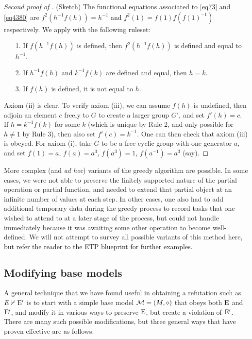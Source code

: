 \begin{proof}[Second proof of ] (Sketch)  The functional equations associated to \eqref{eq73} and \eqref{eq4380} are
$f^2(h^{-1} f(h)) =h^{-1}$ and $f^2(1) = f(1) f(f(1)^{-1})$ respectively.  We apply  with the following ruleset:
\begin{itemize}
  \item[1.]  If $f(h^{-1} f(h))$ is defined, then $f^2(h^{-1} f(h))$ is defined and equal to $h^{-1}$.
  \item[2.]  If $h^{-1} f(h)$ and $k^{-1} f(k)$ are defined and equal, then $h=k$.
  \item[3.]  If $f(h)$ is defined, it is not equal to $h$.
\end{itemize}
Axiom (ii) is clear.  To verify axiom (iii), we can assume $f(h)$ is undefined, then adjoin an element $c$ freely to $G$ to create a larger group $G'$, and set $f'(h) = c$.  If $h = k^{-1} f(k)$ for some $k$ (which is unique by Rule 2, and only possible for $h \neq 1$ by Rule 3), then also set $f'(c) = k^{-1}$.  One can then check that axiom (iii) is obeyed.  For axiom (i), take $G$ to be a free cyclic group with one generator $a$, and set $f(1) = a$, $f(a) = a^3$, $f(a^3) = 1$, $f(a^{-1}) = a^3$ (say).
\end{proof}

More complex (and \emph{ad hoc}) variants of the greedy algorithm are possible.  In some cases, we were not able to preserve the finitely supported nature of the partial operation or partial function, and needed to extend that partial object at an infinite number of values at each step.  In other cases, one also had to add additional temporary data during the greedy process to record tasks that one wished to attend to at a later stage of the process, but could not handle immediately because it was awaiting some other operation to become well-defined.  We will not attempt to survey all possible variants of this method here, but refer the reader to the ETP blueprint for further examples.

\subsection{Modifying base models}\label{modify-base}

A general technique that we have found useful in obtaining a refutation such as $E \nvdash {\mathrm{E}'}$ is to start with a simple base model ${\mathcal{M}} = (M,\diamond)$ that obeys both $\mathrm{E}$ and ${\mathrm{E}'}$, and modify it in various ways to preserve $\mathrm{E}$, but create a violation of ${\mathrm{E}'}$.  There are many such possible modifications, but three general ways that have proven effective are as follows:

